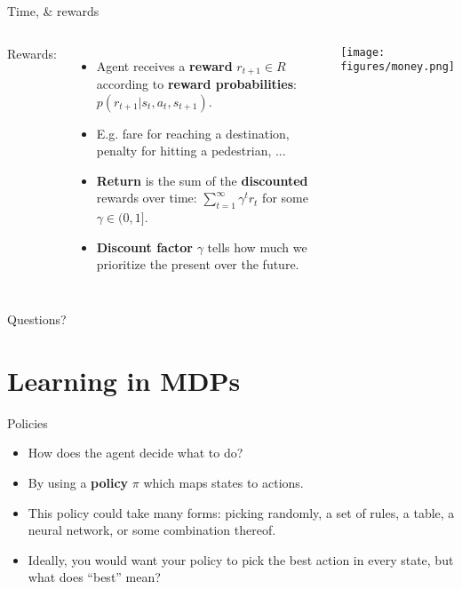\documentclass{beamer}
\begin{document}
\begin{frame}{Time, \& rewards}
\begin{columns}
Rewards:
\begin{itemize}
    \item Agent receives a \textbf{reward} \(r_{t+1} \in R\) according to \textbf{reward probabilities}: \(p(r_{t+1} | s_t, a_t, s_{t+1})\). 
    \item<2-> E.g. fare for reaching a destination, penalty for hitting a pedestrian, ...
    \item<3-> \textbf{Return} is the sum of the \textbf{discounted} rewards over time: \(\sum_{t=1}^\infty \gamma^t r_t\) for some \(\gamma \in (0, 1]\).
    \item<4-> \textbf{Discount factor} \(\gamma\) tells how much we prioritize the present over the future.
\end{itemize}
    \begin{center}
    \texttt{[image: figures/money.png]}
    \end{center}
\end{columns}
\end{frame}


\begin{frame}[standout]
Questions?
\end{frame}

\section{Learning in MDPs}
\begin{frame}{Policies}
\begin{itemize}
\item How does the agent decide what to do?
\item<2-> By using a \textbf{policy} \(\pi\) which maps states to actions.
\item<3-> This policy could take many forms: picking randomly, a set of rules, a table, a neural network, or some combination thereof.
\item<4-> Ideally, you would want your policy to pick the best action in every state, but what does ``best'' mean?
\end{itemize}
\end{frame}
\end{document}

